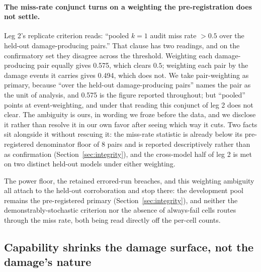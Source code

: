 \documentclass{article}
\begin{document}
\paragraph{The miss-rate conjunct turns on a weighting the pre-registration does
not settle.} Leg 2's replicate criterion reads: ``pooled $k=1$ audit miss rate
$> 0.5$ over the held-out damage-producing pairs.'' That clause has two readings,
and on the confirmatory set they disagree across the threshold.
Weighting each damage-producing pair equally gives 0.575, which clears $0.5$;
weighting each pair by the damage events it carries gives 0.494, which does not.
We take pair-weighting as primary, because ``over the held-out damage-producing
pairs'' names the pair as the unit of analysis, and 0.575 is the figure reported
throughout; but ``pooled'' points at event-weighting, and under that reading this
conjunct of leg 2 does not clear. The ambiguity is ours, in wording we froze
before the data, and we disclose it rather than resolve it in our own favor after
seeing which way it cuts. Two facts sit alongside it without rescuing it: the
miss-rate statistic is already below its pre-registered denominator floor of 8
pairs and is reported descriptively rather than as confirmation
(Section~\ref{sec:integrity}), and the cross-model half of leg 2 is met on two
distinct held-out models under either weighting.

The power floor, the retained errored-run breaches, and this weighting ambiguity
all attach to the held-out corroboration and stop there: the
development pool remains the pre-registered primary
(Section~\ref{sec:integrity}), and neither the demonstrably-stochastic criterion
nor the absence of always-fail cells routes through the miss rate, both being
read directly off the per-cell counts.

\subsection{Capability shrinks the damage surface, not the damage's nature}
\label{sec:gradient}
\end{document}
